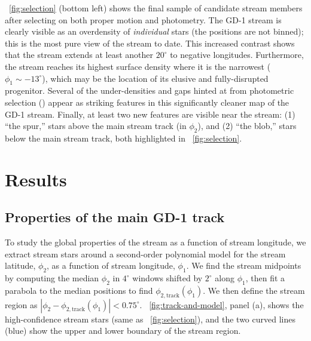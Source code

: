 \documentclass[modern]{aastex62}
\newcommand{\sectionname}{Section}
\begin{document}
\figurename~\ref{fig:selection} (bottom left) shows the final sample of
candidate stream members after selecting on both proper motion and photometry.
The GD-1 stream is clearly visible as an overdensity of \emph{individual}
stars (the positions are not binned); this is the most pure view of the stream
to date.
This increased contrast shows that the stream extends at least another
$20^\circ$ to negative longitudes.
Furthermore, the stream reaches its highest surface density where it is the
narrowest ($\phi_1\sim-13^\circ$), which may be the location of its elusive and
fully-disrupted progenitor.
Several of the under-densities and gaps hinted at from photometric selection
(\citealt{Carlberg:2013, DeBoer:2018}) appear as striking features in this
significantly cleaner map of the GD-1 stream.
Finally, at least two new features are visible near the stream: (1) ``the
spur,'' stars above the main stream track (in $\phi_2$), and (2) ``the blob,''
stars below the main stream track, both highlighted in
\figurename~\ref{fig:selection}.


\section{Results}
\label{sec:results}


\subsection{Properties of the main GD-1 track}
\label{sec:res_global}

To study the global properties of the stream as a function of stream longitude,
we extract stream stars around a second-order polynomial model for the stream
latitude, $\phi_2$, as a function of stream longitude, $\phi_1$.
We find the stream midpoints by computing the median $\phi_2$ in $4^\circ$
windows shifted by $2^\circ$ along $\phi_1$, then fit a parabola to the median
positions to find $\phi_{2, \textrm{track}}(\phi_1)$.
We then define the stream region as $\left| \phi_2 - \phi_{2,
\textrm{track}}(\phi_1) \right| < 0.75^\circ$.
\figurename~\ref{fig:track-and-model}, panel (a), shows the high-confidence
stream stars (same as \figurename~\ref{fig:selection}), and the two curved lines
(blue) show the upper and lower boundary of the stream region.
\end{document}
